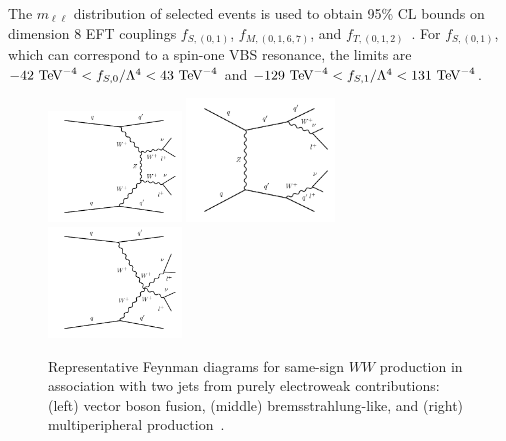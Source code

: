 The $m_{\ell\ell}$ distribution of selected events is used to obtain
95\% CL bounds on dimension 8 EFT couplings $f_{S,(0,1)}$,
$f_{M,(0,1,6,7)}$, and $f_{T,(0,1,2)}$~\cite{Eboli:2006wa}.  For
$f_{S,(0,1)}$, which can correspond to a spin-one VBS resonance, the
limits are $-42\TeV^{-4} < f_{S,0}/\Lambda^4 < 43 \TeV^{-4}$
and $-129 \TeV^{-4} < f_{S,1}/\Lambda^4 < 131 \TeV^{-4}$.

\begin{figure}[htb] {
\centering
\includegraphics[width=0.315\textwidth]{figures/ss-exclboson-ww-diagram1.pdf}
\includegraphics[width=0.35\textwidth]{figures/ss-exclboson-ww-diagram2.pdf}
\includegraphics[width=0.315\textwidth]{figures/ss-exclboson-ww-diagram3.pdf}
\caption{
Representative Feynman diagrams for same-sign $WW$ production in association
with two jets from purely electroweak contributions:
(left) vector boson fusion,
(middle) bremsstrahlung-like,
and (right) multiperipheral production~\cite{Khachatryan:2014sta}.
\label{fig:ss-exclboson-ww-sigdiagram}}

}
\end{figure}



